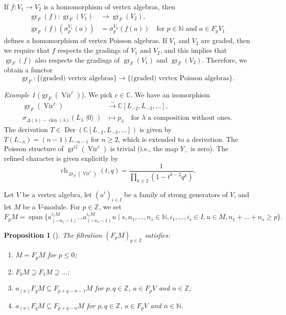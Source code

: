 \documentclass[a4paper, 12pt, reqno]{amsart}
\newtheorem{proposition}[theorem]{Proposition}
\theoremstyle{remark}
\newtheorem{example}[theorem]{Example}
\DeclareMathOperator{\Vir}{Vir}
\DeclareMathOperator{\ch}{ch}
\DeclareMathOperator{\clen}{clen}
\DeclareMathOperator{\vac}{|0\rangle}
\DeclareMathOperator{\gr}{gr}
\DeclareMathOperator{\vspan}{span}
\DeclareMathOperator{\Der}{Der}
\begin{document}
If $f: V_1 \to V_2$ is a homomorphism of vertex algebras, then
\begin{align*}
  \gr_F(f): \gr_F(V_1) &\to \gr_F(V_2), \\
  \gr_F(f)(\sigma^{V_1}_p(a)) &= \sigma^{V_2}_p(f(a)) \quad \text{for $p \in \mathbb{N}$ and $a \in F_pV_1$}
\end{align*}
defines a homomorphism of vertex Poisson algebras.
If $V_1$ and $V_2$ are graded, then we require that $f$ respects the gradings of $V_1$ and $V_2$, and this implies that $\gr_F(f)$ also respects the gradings of $\gr_F(V_1)$ and $\gr_F(V_2)$.
Therefore, we obtain a functor
\begin{equation*}
  \gr_F: \{\text{(graded) vertex algebras}\} \to \{\text{(graded) vertex Poisson algebras}\}.
\end{equation*}

\begin{example}[$\gr_F(\Vir^c)$]
  \label{exa:7}
  We pick $c \in \mathbb{C}$.
  We have an isomorphism
  \begin{align*}
    \gr_F(\Vir^c) &\xrightarrow{\sim} \mathbb{C}[L_{-2}, L_{-3}, \dots], \\
    \sigma_{\Delta(\lambda) - \clen(\lambda)}(L_{\lambda}\vac) &\mapsto p_{\lambda} \quad \text{for $\lambda$ a composition without ones}.
  \end{align*}
  The derivation $T \in \Der(\mathbb{C}[L_{-2}, L_{-3}, \dots])$ is given by $T(L_{-n}) = (n - 1)L_{-n - 1}$ for $n \ge 2$, which is extended to a derivation.
  The Poisson structure of $\gr^G(\Vir^c)$ is trivial (i.e., the map $Y_-$ is zero).
  The refined character is given explicitly by
  \begin{equation*}
    \ch_{\gr_F(\Vir^c)}(t, q) = \frac{1}{\prod_{k \ge 2}(1 - t^{k - 2}q^k)}.
  \end{equation*}
\end{example}

Let $V$ be a vertex algebra, let $(a^i)_{i \in I}$ be a family of strong generators of $V$, and let $M$ be a $V$-module.
For $p \in \mathbb{Z}$, we set
\begin{equation*}
  F_pM = \vspan\{a^{i_1M}_{(-n_1 - 1)}\dots a^{i_sM}_{(-n_s - 1)}u \mid s, n_1, \dots, n_s \in \mathbb{N}, i_1, \dots, i_s \in I, u \in M, n_1 + \dots + n_s \ge p\}.
\end{equation*}

\begin{proposition}[{\cite{li_abelianizing_2005}}]
  \label{prp:5}
  The filtration $(F_pM)_{p \in \mathbb{Z}}$ satisfies:
  \begin{enumerate}
  \item $M = F_pM$ for $p \le 0$;
  \item $F_0M \supseteq F_1M \supseteq \dots$;
  \item $a_{(n)}F_qM \subseteq F_{p + q - n - 1}M$ for $p, q \in \mathbb{Z}$, $a \in F_pV$ and $n \in \mathbb{Z}$;
  \item $a_{(n)}F_qM \subseteq F_{p + q - n}M$ for $p, q \in \mathbb{Z}$, $a \in F_pV$ and $n \in \mathbb{N}$.
  \end{enumerate}
\end{proposition}
\end{document}
